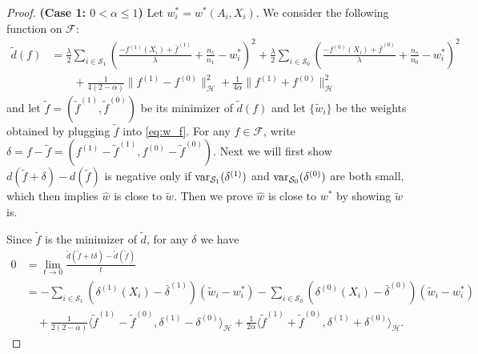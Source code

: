 \documentclass[12pt]{article}
\newcommand{\var}{\textnormal{var}}
\begin{document}
\begin{proof}
	\noindent\textbf{(Case 1: $0 < \alpha \le 1$)}
	Let $w^*_i = w^*(A_i, X_i)$. We consider the following function on $\mathcal{F}$:
	\begin{equation}
		\label{eq:tilde_d_def}
		\begin{aligned}
			\tilde{d}(f)
			&=
			\frac{\lambda}{2} \sum_{i \in \mathcal{S}_1} \left( \frac{-f^{(1)}(X_i) + \bar{f}^{(1)}} {\lambda} + \frac{n_s}{n_1} - w^*_i \right)^2 +
			\frac{\lambda}{2} \sum_{i \in \mathcal{S}_0} \left( \frac{-f^{(0)}(X_i) + \bar{f}^{(0)}} {\lambda} + \frac{n_s}{n_0} - w^*_i \right)^2
			\\&\qquad+
			\frac{1}{4(2-\alpha)} \| f^{(1)} - f^{(0)} \|_\mathcal{H}^2 +
			\frac{1}{4\alpha} \| f^{(1)} + f^{(0)} \|_\mathcal{H}^2
		\end{aligned}
	\end{equation}
	and let $\tilde{f} = (\tilde{f}^{(1)}, \tilde{f}^{(0)})$ be its minimizer of $\tilde{d}(f)$ and let $\{\tilde{w}_i\}$ be the weights obtained by plugging $\tilde{f}$ into \eqref{eq:w_f}. For any $f \in \mathcal{F}$, write $\delta = f - \tilde{f} = (f^{(1)} - \tilde{f}^{(1)} , f^{(0)} - \tilde{f}^{(0)})$. Next we will first show $d(\tilde{f} + \delta) - d(\tilde{f})$ is negative only if $\var_{\mathcal{S}_1}(\delta^{(1)})$ and $\var_{\mathcal{S}_0}(\delta^{(0)})$ are both small, which then implies $\hat{w}$ is close to $\tilde{w}$. Then we prove $\hat{w}$ is close to $w^*$ by showing $\tilde{w}$ is.
	
	Since $\tilde{f}$ is the minimizer of $\tilde{d}$, for any $\delta$ we have
	\begin{equation}
		\label{eq:tilde_f_eq}
		\begin{aligned}
			0 &= 
			\lim_{t \rightarrow 0} \frac{\tilde{d}(\tilde{f} + t\delta) - \tilde{d}(\tilde{f})}{t} 
			\\&=
			-\sum_{i \in \mathcal{S}_1}(\delta^{(1)}(X_i) - \bar{\delta}^{(1)})(\tilde{w}_i - w_i^*)
			-\sum_{i \in \mathcal{S}_0}(\delta^{(0)}(X_i) - \bar{\delta}^{(0)})(\tilde{w}_i - w_i^*)
			\\&\quad
			+ \frac{1}{2(2-\alpha)} \langle \tilde{f}^{(1)} - \tilde{f}^{(0)}, \delta^{(1)} - \delta^{(0)} \rangle_\mathcal{H}
			+ \frac{1}{2\alpha} \langle \tilde{f}^{(1)} + \tilde{f}^{(0)}, \delta^{(1)} + \delta^{(0)} \rangle_\mathcal{H}
			.\end{aligned}
	\end{equation}
	

\end{proof}
\end{document}
